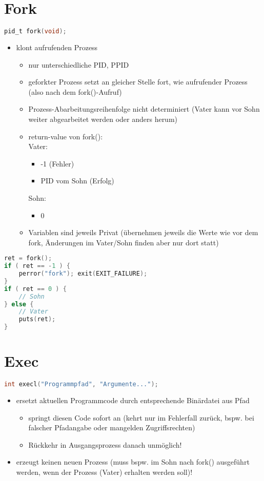 \documentclass{scrreprt}
\renewcommand{\imptnt}[1]{#1}
\begin{document}
\section{Fork}
\begin{lstlisting}[language=C]
pid_t fork(void);
\end{lstlisting}
\begin{itemize}
\item klont aufrufenden Prozess
\begin{itemize}[label=$\to$]
\item nur unterschiedliche PID, PPID
\item geforkter Prozess \imptnt{setzt an gleicher Stelle fort}, wie aufrufender Prozess (also nach dem fork()-Aufruf)
\item Prozess-Abarbeitungsreihenfolge \imptnt{nicht determiniert} (Vater kann vor Sohn weiter abgearbeitet werden oder anders herum)
\item return-value von fork():\\
Vater:
\begin{itemize}
\item -1 (Fehler)
\item PID vom Sohn (Erfolg)
\end{itemize}
Sohn:
\begin{itemize}
\item 0
\end{itemize}
\item Variablen sind jeweils Privat (übernehmen jeweils die Werte wie vor dem fork, Änderungen im Vater/Sohn finden aber nur dort statt)
\end{itemize}
\end{itemize}
\begin{lstlisting}[language=C]
ret = fork();
if ( ret == -1 ) {
	perror("fork"); exit(EXIT_FAILURE);
}
if ( ret == 0 ) {
	// Sohn
} else {
	// Vater
	puts(ret);
}
\end{lstlisting}
\section{Exec}
\begin{lstlisting}[language=C]
int execl("Programmpfad", "Argumente...");
\end{lstlisting}
\begin{itemize}
\item ersetzt aktuellen Programmcode durch entsprechende Binärdatei aus Pfad
\begin{itemize} [label=$\to$]
\item springt diesen Code sofort an (kehrt nur im Fehlerfall zurück, bspw. bei falscher Pfadangabe oder mangelden Zugriffsrechten)
\item \imptnt{Rückkehr in Ausgangsprozess danach unmöglich!}
\end{itemize}
\item erzeugt keinen neuen Prozess (muss bspw. im Sohn nach fork() ausgeführt werden, wenn der Prozess (Vater) erhalten werden soll)!
\end{itemize}
\end{document}
